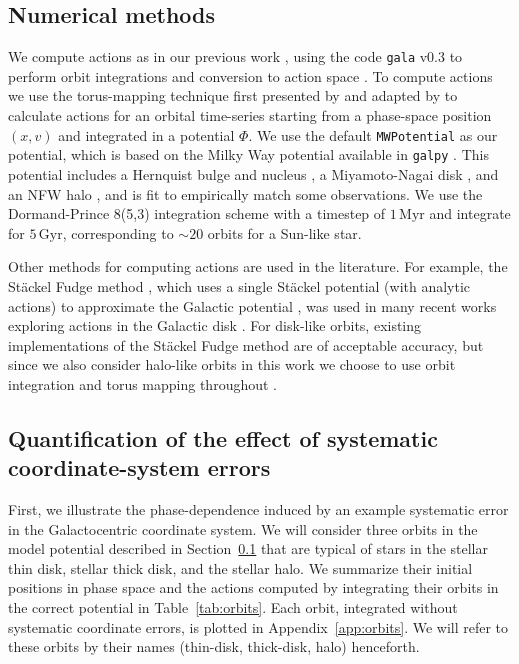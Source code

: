 \documentclass[twocolumn]{aastex62}
\newcommand{\Myr}{\text{Myr}}
\newcommand{\Gyr}{\text{Gyr}}
\begin{document}
\subsection{Numerical methods} \label{ssec:action_comp}
We compute actions as in our previous work \citep{2018ApJ...867...31B}, using
the code \texttt{gala} v0.3 to perform orbit integrations and conversion to
action space \citep{2017JOSS....2..388P,Price-Whelan:2018}. To compute actions
we use the torus-mapping technique first presented by
\citet{1990MNRAS.244..634M} and adapted by \citet{2014MNRAS.441.3284S} to
calculate actions for an orbital time-series starting from a phase-space
position $(x, v)$ and integrated in a potential $\Phi$. We use the default
\texttt{MWPotential} as our potential, which is based on the Milky Way
potential available in \texttt{galpy} \citep{2015ApJS..216...29B}. This
potential includes a Hernquist bulge and nucleus \citep{1990ApJ...356..359H},
a Miyamoto-Nagai disk \citep{1975PASJ...27..533M}, and an NFW halo
\citep{1997ApJ...490..493N}, and is fit to empirically match some
observations. We use the Dormand-Prince 8(5,3) integration scheme
\citep{Dormand80:integrator} with a timestep of $1\,\Myr$ and integrate for
$5\,\Gyr$, corresponding to $\sim 20$ orbits for a Sun-like star.

Other methods for computing actions are used in the literature. For example,
the St\"ackel Fudge method \citep{2016MNRAS.457.2107S}, which uses a single
St\"ackel potential (with analytic actions) to approximate the Galactic
potential \citep{1985MNRAS.216..273D,2012MNRAS.426.1324B}, was used in many
recent works exploring actions in the Galactic disk
\citep[e.g.][]{2018arXiv180503653T,2018MNRAS.481.4093S,2018arXiv180803278T}.
For disk-like orbits, existing implementations of the St\"ackel Fudge method
are of acceptable accuracy, but since we also consider halo-like orbits in
this work we choose to use orbit integration and torus mapping throughout
\citep{2016MNRAS.457.2107S}.

\subsection{Quantification of the effect of systematic coordinate-system
errors} \label{ssec:quant}
First, we illustrate the phase-dependence induced by an
example systematic error in the Galactocentric coordinate system. We will
consider three orbits in the model potential described in
Section~\ref{ssec:action_comp} that are typical of stars in the stellar thin
disk, stellar thick disk, and the stellar halo. We summarize their initial
positions in phase space and the actions computed by integrating their orbits
in the correct potential in Table~\ref{tab:orbits}. Each orbit, integrated
without systematic coordinate errors, is plotted in Appendix~\ref{app:orbits}.
We will refer to these orbits by their names (thin-disk, thick-disk, halo)
henceforth.
\end{document}
